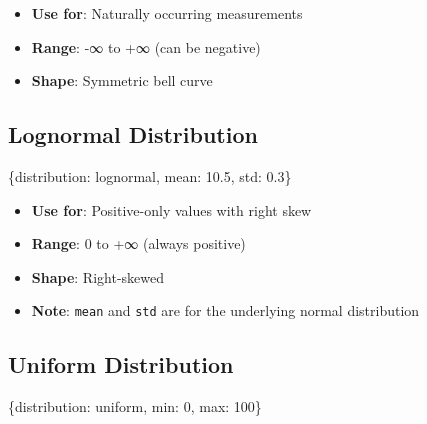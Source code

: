 \documentclass[
  letterpaper,
]{scrbook}
\newenvironment{Shaded}{\begin{snugshade}}{\end{snugshade}}
\newcommand{\DecValTok}[1]{\textcolor[rgb]{0.68,0.00,0.00}{#1}}
\newcommand{\FloatTok}[1]{\textcolor[rgb]{0.68,0.00,0.00}{#1}}
\newcommand{\NormalTok}[1]{\textcolor[rgb]{0.00,0.23,0.31}{#1}}
\newcommand{\StringTok}[1]{\textcolor[rgb]{0.13,0.47,0.30}{#1}}
\providecommand{\tightlist}{%
  \setlength{\itemsep}{0pt}\setlength{\parskip}{0pt}}
\begin{document}
\begin{itemize}
\tightlist
\item
  \textbf{Use for}: Naturally occurring measurements
\item
  \textbf{Range}: -∞ to +∞ (can be negative)
\item
  \textbf{Shape}: Symmetric bell curve
\end{itemize}

\subsection{Lognormal Distribution}\label{lognormal-distribution}

\begin{Shaded}
\begin{Highlighting}[]
\NormalTok{\{}\StringTok{\textquotesingle{}distribution\textquotesingle{}}\NormalTok{: }\StringTok{\textquotesingle{}lognormal\textquotesingle{}}\NormalTok{, }\StringTok{\textquotesingle{}mean\textquotesingle{}}\NormalTok{: }\FloatTok{10.5}\NormalTok{, }\StringTok{\textquotesingle{}std\textquotesingle{}}\NormalTok{: }\FloatTok{0.3}\NormalTok{\}}
\end{Highlighting}
\end{Shaded}

\begin{itemize}
\tightlist
\item
  \textbf{Use for}: Positive-only values with right skew
\item
  \textbf{Range}: 0 to +∞ (always positive)
\item
  \textbf{Shape}: Right-skewed
\item
  \textbf{Note}: \texttt{mean} and \texttt{std} are for the underlying
  normal distribution
\end{itemize}

\subsection{Uniform Distribution}\label{uniform-distribution-1}

\begin{Shaded}
\begin{Highlighting}[]
\NormalTok{\{}\StringTok{\textquotesingle{}distribution\textquotesingle{}}\NormalTok{: }\StringTok{\textquotesingle{}uniform\textquotesingle{}}\NormalTok{, }\StringTok{\textquotesingle{}min\textquotesingle{}}\NormalTok{: }\DecValTok{0}\NormalTok{, }\StringTok{\textquotesingle{}max\textquotesingle{}}\NormalTok{: }\DecValTok{100}\NormalTok{\}}
\end{Highlighting}
\end{Shaded}
\end{document}

